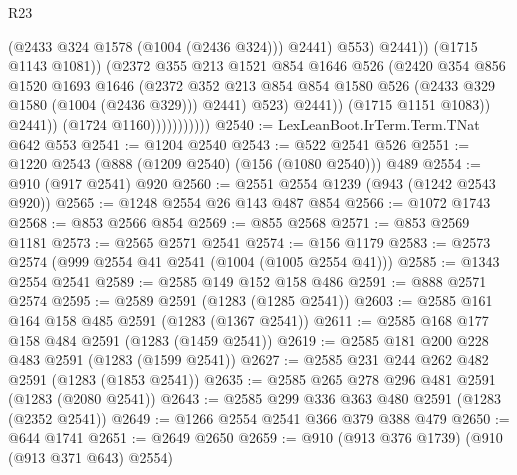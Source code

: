 \begin{lexlean}{R23}
\begin{coremodule}
                                          (@2433 @324 @1578 (@1004 (@2436 @324)))
                                          @2441)
                                        @553)
                                      @2441))
                                  (@1715 @1143 @1081))
                                (@2372
                                  @355
                                  @213
                                  @1521
                                  @854
                                  @1646
                                  @526
                                  (@2420
                                    @354
                                    @856
                                    @1520
                                    @1693
                                    @1646
                                    (@2372
                                      @352
                                      @213
                                      @854
                                      @854
                                      @1580
                                      @526
                                      (@2433 @329 @1580 (@1004 (@2436 @329)))
                                      @2441)
                                    @523)
                                  @2441))
                              (@1715 @1151 @1083))
                            @2441))
                        (@1724 @1160)))))))))))
@2540 := LexLeanBoot.IrTerm.Term.TNat @642 @553
@2541 := @1204 @2540
@2543 := @522 @2541 @526
@2551 := @1220 @2543 (@888 (@1209 @2540) (@156 (@1080 @2540))) @489
@2554 := @910 (@917 @2541) @920
@2560 := @2551 @2554 @1239 (@943 (@1242 @2543 @920))
@2565 := @1248 @2554 @26 @143 @487 @854
@2566 := @1072 @1743
@2568 := @853 @2566 @854
@2569 := @855 @2568
@2571 := @853 @2569 @1181
@2573 := @2565 @2571 @2541
@2574 := @156 @1179
@2583 := @2573 @2574 (@999 @2554 @41 @2541 (@1004 (@1005 @2554 @41)))
@2585 := @1343 @2554 @2541
@2589 := @2585 @149 @152 @158 @486
@2591 := @888 @2571 @2574
@2595 := @2589 @2591 (@1283 (@1285 @2541))
@2603 := @2585 @161 @164 @158 @485 @2591 (@1283 (@1367 @2541))
@2611 := @2585 @168 @177 @158 @484 @2591 (@1283 (@1459 @2541))
@2619 := @2585 @181 @200 @228 @483 @2591 (@1283 (@1599 @2541))
@2627 := @2585 @231 @244 @262 @482 @2591 (@1283 (@1853 @2541))
@2635 := @2585 @265 @278 @296 @481 @2591 (@1283 (@2080 @2541))
@2643 := @2585 @299 @336 @363 @480 @2591 (@1283 (@2352 @2541))
@2649 := @1266 @2554 @2541 @366 @379 @388 @479
@2650 := @644 @1741
@2651 := @2649 @2650
@2659 := @910 (@913 @376 @1739) (@910 (@913 @371 @643) @2554)

\end{coremodule}
\end{lexlean}
